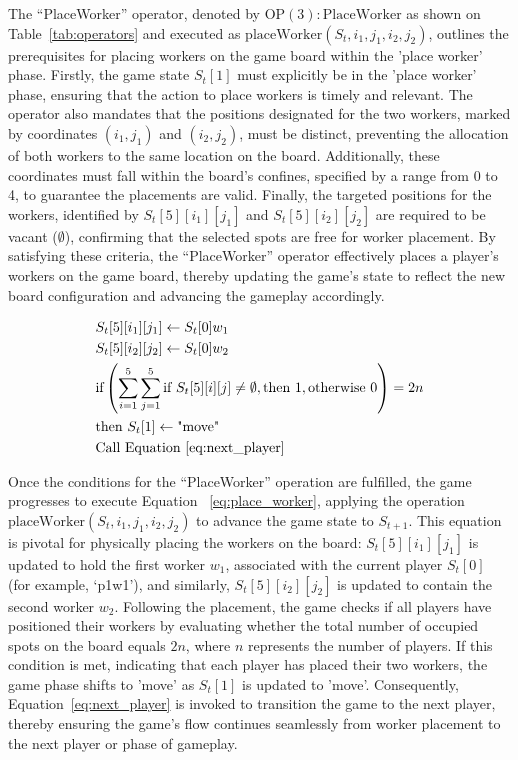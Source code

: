 \documentclass{telkomnika}
\begin{document}
The ``PlaceWorker'' operator, denoted by \( \text{OP}(3):\text{PlaceWorker} \) as shown on Table~\ref{tab:operators} and executed as \( \text{placeWorker}(S_t, i_1, j_1, i_2, j_2) \), outlines the prerequisites for placing workers on the game board within the 'place worker' phase. Firstly, the game state \( S_t[1] \) must explicitly be in the 'place worker' phase, ensuring that the action to place workers is timely and relevant. The operator also mandates that the positions designated for the two workers, marked by coordinates \( (i_1, j_1) \) and \( (i_2, j_2) \), must be distinct, preventing the allocation of both workers to the same location on the board. Additionally, these coordinates must fall within the board's confines, specified by a range from 0 to 4, to guarantee the placements are valid. Finally, the targeted positions for the workers, identified by \( S_t[5][i_1][j_1] \) and \( S_t[5][i_2][j_2] \) are required to be vacant (\(\emptyset\)), confirming that the selected spots are free for worker placement. By satisfying these criteria, the ``PlaceWorker'' operator effectively places a player's workers on the game board, thereby updating the game's state to reflect the new board configuration and advancing the gameplay accordingly.

\begin{equation}
    \begin{aligned}
        &S_t[5][i_1][j_1] \leftarrow S_t[0] w_1 \\
        &S_t[5][i_2][j_2] \leftarrow S_t[0] w_2 \\
        &\text{if}\left ( \sum_{i=1}^{5}\sum_{j=1}^{5}\text{if } S_t[5][i][j]\neq \emptyset,\text{then } 1, \text{otherwise } 0 \right )=2n \\
        &\text{then } S_t[1] \leftarrow \text{"move"}\\
        &\text{Call Equation~\ref{eq:next_player}}
    \end{aligned}
    \label{eq:place_worker}
\end{equation}

Once the conditions for the ``PlaceWorker'' operation are fulfilled, the game progresses to execute Equation ~\ref{eq:place_worker}, applying the operation \( \text{placeWorker}(S_t, i_1, j_1, i_2, j_2) \) to advance the game state to \( S_{t+1} \). This equation is pivotal for physically placing the workers on the board: \( S_t[5][i_1][j_1] \) is updated to hold the first worker \( w_1 \), associated with the current player \( S_t[0] \) (for example, ‘p1w1’), and similarly, \( S_t[5][i_2][j_2] \) is updated to contain the second worker \( w_2 \). Following the placement, the game checks if all players have positioned their workers by evaluating whether the total number of occupied spots on the board equals \( 2n \), where \( n \) represents the number of players. If this condition is met, indicating that each player has placed their two workers, the game phase shifts to 'move' as \( S_t[1] \) is updated to 'move'. Consequently, Equation~\ref{eq:next_player} is invoked to transition the game to the next player, thereby ensuring the game's flow continues seamlessly from worker placement to the next player or phase of gameplay.
\end{document}
